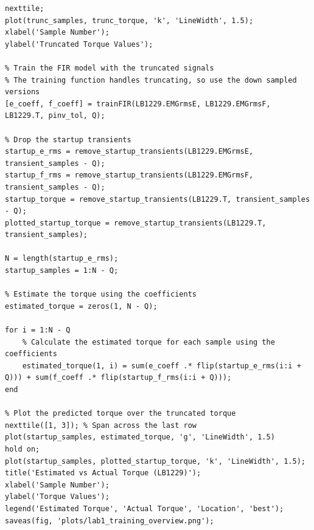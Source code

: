 \documentclass[12pt]{article}
\begin{document}
\begin{lstlisting}[caption={generate\_training\_overview.m}]
% Original torque signal
nexttile;
plot(trunc_samples, trunc_torque, 'k', 'LineWidth', 1.5);
xlabel('Sample Number');
ylabel('Truncated Torque Values');

% Train the FIR model with the truncated signals
% The training function handles truncating, so use the down sampled versions
[e_coeff, f_coeff] = trainFIR(LB1229.EMGrmsE, LB1229.EMGrmsF, LB1229.T, pinv_tol, Q);

% Drop the startup transients
startup_e_rms = remove_startup_transients(LB1229.EMGrmsE, transient_samples - Q);
startup_f_rms = remove_startup_transients(LB1229.EMGrmsF, transient_samples - Q);
startup_torque = remove_startup_transients(LB1229.T, transient_samples - Q);
plotted_startup_torque = remove_startup_transients(LB1229.T, transient_samples);

N = length(startup_e_rms);
startup_samples = 1:N - Q;

% Estimate the torque using the coefficients
estimated_torque = zeros(1, N - Q);

for i = 1:N - Q
    % Calculate the estimated torque for each sample using the coefficients
    estimated_torque(1, i) = sum(e_coeff .* flip(startup_e_rms(i:i + Q))) + sum(f_coeff .* flip(startup_f_rms(i:i + Q)));
end

% Plot the predicted torque over the truncated torque
nexttile([1, 3]); % Span across the last row
plot(startup_samples, estimated_torque, 'g', 'LineWidth', 1.5)
hold on;
plot(startup_samples, plotted_startup_torque, 'k', 'LineWidth', 1.5);
title('Estimated vs Actual Torque (LB1229)');
xlabel('Sample Number');
ylabel('Torque Values');
legend('Estimated Torque', 'Actual Torque', 'Location', 'best');
saveas(fig, 'plots/lab1_training_overview.png');
\end{lstlisting}
\end{document}
